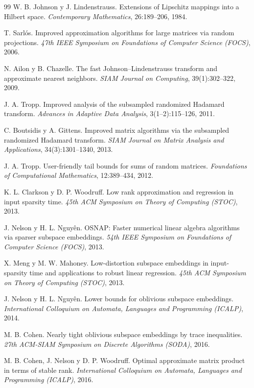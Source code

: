 \documentclass[11pt,a4paper,oneside]{book}
\theoremstyle{definition}
\theoremstyle{remark}
\begin{document}
\begin{thebibliography}{99}
 W. B. Johnson y J. Lindenstrauss. Extensions of Lipschitz mappings into a Hilbert space.
\emph{Contemporary Mathematics}, 26:189--206, 1984.

 T. Sarlós. Improved approximation algorithms for large matrices via random projections.
\emph{47th IEEE Symposium on Foundations of Computer Science (FOCS)}, 2006.

 N. Ailon y B. Chazelle. The fast Johnson--Lindenstrauss transform and approximate nearest neighbors.
\emph{SIAM Journal on Computing}, 39(1):302--322, 2009.

 J. A. Tropp. Improved analysis of the subsampled randomized Hadamard transform. \emph{Advances in
Adaptive Data Analysis}, 3(1--2):115--126, 2011.

 C. Boutsidis y A. Gittens. Improved matrix algorithms via the subsampled randomized Hadamard transform.
\emph{SIAM Journal on Matrix Analysis and Applications}, 34(3):1301--1340, 2013.

 J. A. Tropp. User-friendly tail bounds for sums of random matrices. \emph{Foundations of Computational
Mathematics}, 12:389--434, 2012.

 K. L. Clarkson y D. P. Woodruff. Low rank approximation and regression in input sparsity time.
\emph{45th ACM Symposium on Theory of Computing (STOC)}, 2013.

 J. Nelson y H. L. Nguyên. OSNAP: Faster numerical linear algebra algorithms via sparser subspace
embeddings. \emph{54th IEEE Symposium on Foundations of Computer Science (FOCS)}, 2013.

 X. Meng y M. W. Mahoney. Low-distortion subspace embeddings in input-sparsity time and applications to
robust linear regression. \emph{45th ACM Symposium on Theory of Computing (STOC)}, 2013.

 J. Nelson y H. L. Nguyên. Lower bounds for oblivious subspace embeddings. \emph{International
Colloquium on Automata, Languages and Programming (ICALP)}, 2014.

 M. B. Cohen. Nearly tight oblivious subspace embeddings by trace inequalities. \emph{27th ACM-SIAM
Symposium on Discrete Algorithms (SODA)}, 2016.

 M. B. Cohen, J. Nelson y D. P. Woodruff. Optimal approximate matrix product in terms of stable rank.
\emph{International Colloquium on Automata, Languages and Programming (ICALP)}, 2016.


\end{thebibliography}
\end{document}
